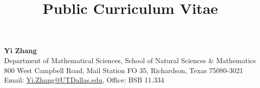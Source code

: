 \documentclass[a4paper,12pt]{article}
\title{\bf{\Huge{Public Curriculum Vitae}}}
\author{}
\date{}
\begin{document}
\maketitle
\thispagestyle{empty}

\begin{center}
    \textbf{Yi Zhang} \\
    Department of Mathematical Sciences, School of Natural Sciences \& Mathematics \\
    800 West Campbell Road, Mail Station FO 35, Richardson, Texas 75080-3021 \\
    Email: \href{mailto:Yi.Zhang@UTDallas.edu}{Yi.Zhang@UTDallas.edu}, Office:  BSB 11.334
 \end{center}



\end{document}
